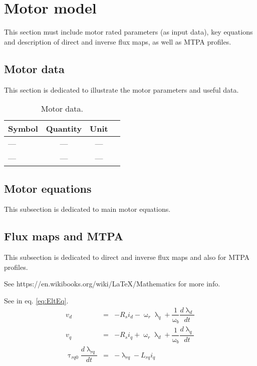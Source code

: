 \section{Motor model}
\label{Sect:1}
This section must include motor rated parameters (as input data), key equations and description of direct and inverse flux maps, as well as MTPA profiles.

\subsection{Motor data}
This section is dedicated to illustrate the motor parameters and useful data.

\begin{table}[!h]
	\captionsetup{justification=justified}
	\caption{Motor data.}
	\label{tab:Motor_data}
	\centering
		\begin{tabular}{@{}lccc@{}} 
		\toprule
		\toprule
		\textbf{Symbol} & \textbf{Quantity} & \textbf{Unit}\\ 
		\midrule
		---		& --- 	& ---	\\
		---		& --- 	& ---	\\
		\bottomrule
		\end{tabular}
	\vspace{-10pt}
\end{table}


\subsection{Motor equations}
This subsection is dedicated to main motor equations.

\subsection{Flux maps and MTPA}
This subsection is dedicated to direct and inverse flux maps and also for MTPA profiles.


\par See https://en.wikibooks.org/wiki/LaTeX/Mathematics for more info.
\par See in eq. \eqref{eq:EltEq}.
\begin{equation}
	\begin{array}{ccc}
		v_{d} &=& -R_{s} i_{d} - \upomega_r \uplambda_{q} + \dfrac{1}{\upomega_b}\dfrac{d\uplambda_{d}}{dt} \\[15pt]
		v_{q} &=& -R_{s} i_{q} + \upomega_r \uplambda_{d} + \dfrac{1}{\upomega_b}\dfrac{d\uplambda_{q}}{dt}\\[15pt]
		\uptau_{rq0} \dfrac{d \uplambda_{rq}}{dt}&=& -\uplambda_{rq} - L_{rq} i_{q}
	\end{array}
	\label{eq:EltEq}
\end{equation}


